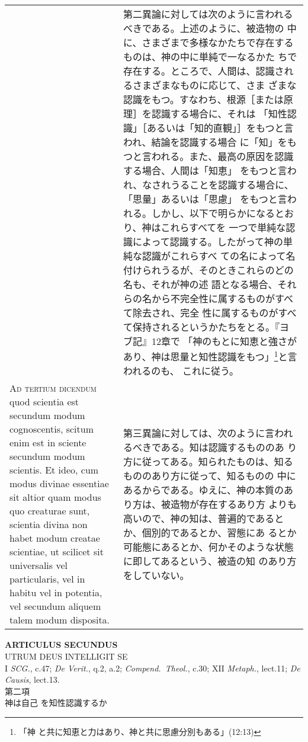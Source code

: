 \documentclass[10pt]{jsarticle} %
\begin{document}
\begin{longtable}{p{21em}p{21em}}
&

第二異論に対しては次のように言われるべきである。上述のように、被造物の
中に、さまざまで多様なかたちで存在するものは、神の中に単純で一なるかた
ちで存在する。ところで、人間は、認識されるさまざまなものに応じて、さま
ざまな認識をもつ。すなわち、根源［または原理］を認識する場合に、それは
「知性認識」［あるいは「知的直観」］をもつと言われ、結論を認識する場合
に「知」をもつと言われる。また、最高の原因を認識する場合、人間は「知恵」
をもつと言われ、なされうることを認識する場合に、「思量」あるいは「思慮」
をもつと言われる。しかし、以下で明らかになるとおり、神はこれらすべてを
一つで単純な認識によって認識する。したがって神の単純な認識がこれらすべ
ての名によって名付けられうるが、そのときこれらのどの名も、それが神の述
語となる場合、それらの名から不完全性に属するものがすべて除去され、完全
性に属するものがすべて保持されるというかたちをとる。『ヨブ記』12章で
「神のもとに知恵と強さがあり、神は思量と知性認識をもつ」\footnote{「神
と共に知恵と力はあり、神と共に思慮分別もある」(12:13)}と言われるのも、
これに従う。

\\



{\scshape Ad tertium dicendum} quod scientia est secundum modum
cognoscentis, scitum enim est in sciente secundum modum scientis. Et
ideo, cum modus divinae essentiae sit altior quam modus quo creaturae
sunt, scientia divina non habet modum creatae scientiae, ut scilicet
sit universalis vel particularis, vel in habitu vel in potentia, vel
secundum aliquem talem modum disposita.

&

第三異論に対しては、次のように言われるべきである。知は認識するもののあ
り方に従ってある。知られたものは、知るもののあり方に従って、知るものの
中にあるからである。ゆえに、神の本質のあり方は、被造物が存在するあり方
よりも高いので、神の知は、普遍的であるとか、個別的であるとか、習態にあ
るとか可能態にあるとか、何かそのような状態に即してあるという、被造の知
のあり方をしていない。



\end{longtable}
\newpage

\begin{center}
{\Large {\bf ARTICULUS SECUNDUS}}\\ {\large UTRUM DEUS INTELLIGIT
SE}\\ {\footnotesize I {\itshape SCG.}, c.47; {\itshape De Verit.},
q.2, a.2; {\itshape Compend.~Theol.}, c.30; XII {\itshape Metaph.},
lect.11; {\itshape De Causis}, lect.13.}\\ {\Large 第二項\\神は自己
を知性認識するか}
\end{center}
\end{document}
